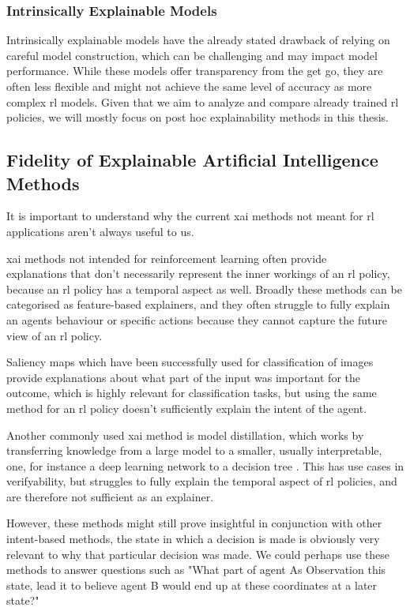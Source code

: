 \documentclass[UKenglish]{uiomasterthesis}
\begin{document}
\subsubsection{Intrinsically Explainable Models}
Intrinsically explainable models have the already stated drawback of relying on careful model construction, which can be challenging and may impact model performance. While these models offer transparency from the get go, they are often less flexible and might not achieve the same level of accuracy as more complex \ac{rl} models. Given that we aim to analyze and compare already trained \ac{rl} policies, we will mostly focus on post hoc explainability methods in this thesis.

\medskip

\subsection{Fidelity of Explainable Artificial Intelligence Methods}
It is important to understand why the current \ac{xai} methods not meant for \ac{rl} applications aren't always useful to us.

\ac{xai} methods not intended for reinforcement learning often provide\\ explanations that don't necessarily represent the inner workings of an \ac{rl} policy, because an \ac{rl} policy has a temporal aspect as well. Broadly these methods can be categorised as feature-based explainers, and they often struggle to fully explain an agents behaviour or specific actions because they cannot capture the future view of an \ac{rl} policy. 

Saliency maps which have been successfully used for classification of images provide explanations about what part of the input was important for the outcome, which is highly relevant for classification tasks, but using the same method for an \ac{rl} policy doesn't sufficiently explain the intent of the agent\cite{atrey2020exploratory}.

Another commonly used \ac{xai} method is model distillation, which works by transferring knowledge from a large model to a smaller, usually interpretable, one, for instance a deep learning network to a decision tree \cite{bastani2019verifiable}. This has use cases in verifyability, but struggles to fully explain the temporal aspect of \ac{rl} policies, and are therefore not sufficient as an explainer.

However, these methods might still prove insightful in conjunction with other intent-based methods, the state in which a decision is made is obviously very relevant to why that particular decision was made. We could perhaps use these methods to answer questions such as "What part of agent As Observation this state, lead it to believe agent B would end up at these coordinates at a later state?"
\medskip
\end{document}
